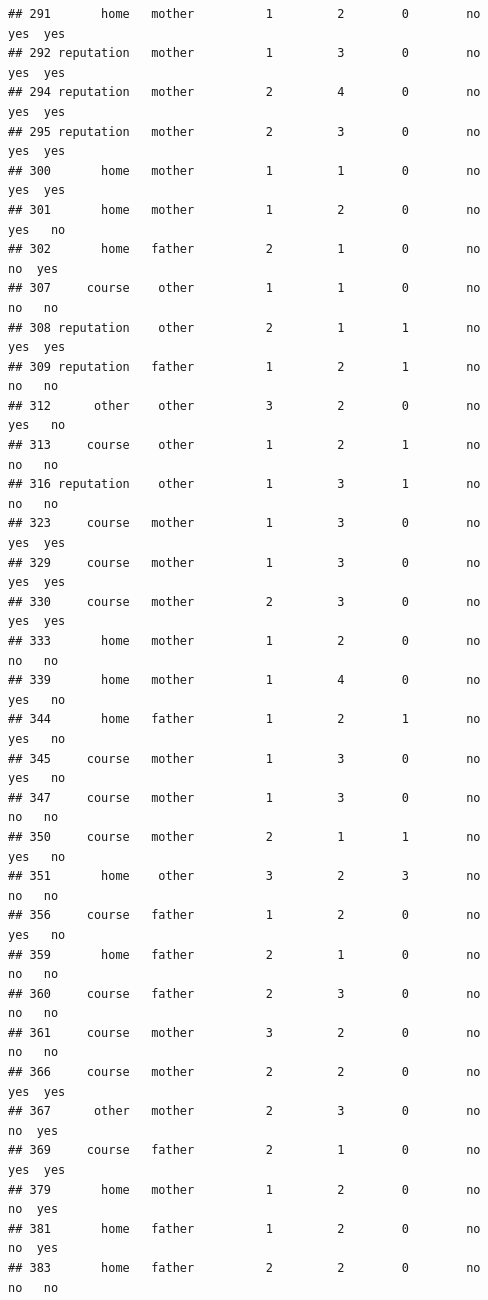 \documentclass[
]{article}
\begin{document}
\begin{verbatim}
## 291       home   mother          1         2        0        no    yes  yes
## 292 reputation   mother          1         3        0        no    yes  yes
## 294 reputation   mother          2         4        0        no    yes  yes
## 295 reputation   mother          2         3        0        no    yes  yes
## 300       home   mother          1         1        0        no    yes  yes
## 301       home   mother          1         2        0        no    yes   no
## 302       home   father          2         1        0        no     no  yes
## 307     course    other          1         1        0        no     no   no
## 308 reputation    other          2         1        1        no    yes  yes
## 309 reputation   father          1         2        1        no     no   no
## 312      other    other          3         2        0        no    yes   no
## 313     course    other          1         2        1        no     no   no
## 316 reputation    other          1         3        1        no     no   no
## 323     course   mother          1         3        0        no    yes  yes
## 329     course   mother          1         3        0        no    yes  yes
## 330     course   mother          2         3        0        no    yes  yes
## 333       home   mother          1         2        0        no     no   no
## 339       home   mother          1         4        0        no    yes   no
## 344       home   father          1         2        1        no    yes   no
## 345     course   mother          1         3        0        no    yes   no
## 347     course   mother          1         3        0        no     no   no
## 350     course   mother          2         1        1        no    yes   no
## 351       home    other          3         2        3        no     no   no
## 356     course   father          1         2        0        no    yes   no
## 359       home   father          2         1        0        no     no   no
## 360     course   father          2         3        0        no     no   no
## 361     course   mother          3         2        0        no     no   no
## 366     course   mother          2         2        0        no    yes  yes
## 367      other   mother          2         3        0        no     no  yes
## 369     course   father          2         1        0        no    yes  yes
## 379       home   mother          1         2        0        no     no  yes
## 381       home   father          1         2        0        no     no  yes
## 383       home   father          2         2        0        no     no   no

\end{verbatim}
\end{document}
